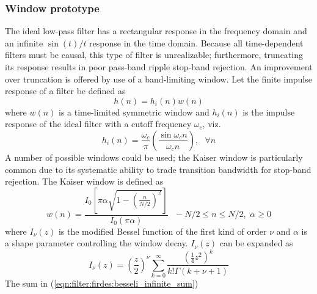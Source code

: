 \subsubsection{Window prototype}
\label{module:filter:firdes:window}
The ideal low-pass filter has a rectangular response in the frequency
domain and an infinite $\sin(t)/t$ response in the time domain.
Because all time-dependent filters must be causal, this type of filter
is unrealizable;
furthermore, truncating its response results in poor pass-band ripple
stop-band rejection.
An improvement over truncation is offered by use of a band-limiting
window.
Let the finite impulse response of a filter be defined as
% 
\begin{equation}
\label{eqn:filter:firdes:windowed_sinc}
    h(n) = h_i(n) w(n)
\end{equation}
%
where $w(n)$ is a time-limited symmetric window and
$h_i(n)$ is the impulse response of the ideal filter with a cutoff
frequency $\omega_c$, viz.
%
\begin{equation}
\label{eqn:filter:firdes:sinc}
    h_i(n) =    \frac{\omega_c}{\pi}
                \left(
                    \frac{\sin\omega_c n}{\omega_c n}
                \right),
                \,\,\,\,
                \forall n
\end{equation}
%
A number of possible windows could be used;
the Kaiser window is particularly common due to its systematic ability
to trade transition bandwidth for stop-band rejection.
The Kaiser window is defined as
%
\begin{equation}
\label{eqn:filter:firdes:kaiser_window}
    w(n) =  \frac{
                I_0\left[\pi\alpha\sqrt{1-\left(\frac{n}{N/2}\right)^2}\right]
            }{
                I_0\left(\pi\alpha\right)
            }
            \,\,\,\,
            -N/2 \leq n \leq N/2,
            \,\,
            \alpha \geq 0
\end{equation}
%
where $I_\nu(z)$ is the modified Bessel function of the first kind of
order $\nu$ and $\alpha$ is a shape parameter controlling the window
decay.
%
$I_\nu(z)$ can be expanded as
%
\begin{equation}
\label{eqn:filter:firdes:besseli_infinite_sum}
    I_\nu(z) =  \left( \frac{z}{2} \right)^\nu
                \sum_{k=0}^{\infty}{
                    \frac{
                        \left(\frac{1}{4}z^2\right)^k
                    }{
                        k!\Gamma(k+\nu+1)
                    }
                }
\end{equation}
%
The sum in (\ref{eqn:filter:firdes:besseli_infinite_sum})
